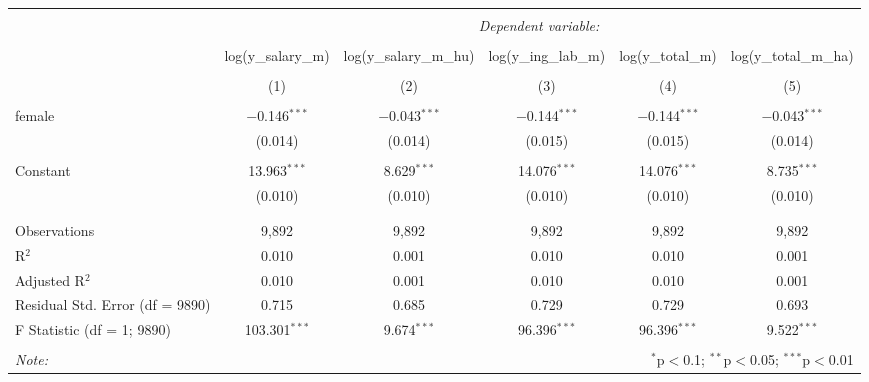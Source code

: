 
\begin{table}[!htbp] \centering 
  \caption{} 
  \label{} 
\begin{tabular}{@{\extracolsep{5pt}}lccccc} 
\\[-1.8ex]\hline 
\hline \\[-1.8ex] 
 & \multicolumn{5}{c}{\textit{Dependent variable:}} \\ 
\cline{2-6} 
\\[-1.8ex] & log(y\_salary\_m) & log(y\_salary\_m\_hu) & log(y\_ing\_lab\_m) & log(y\_total\_m) & log(y\_total\_m\_ha) \\ 
\\[-1.8ex] & (1) & (2) & (3) & (4) & (5)\\ 
\hline \\[-1.8ex] 
 female & $-$0.146$^{***}$ & $-$0.043$^{***}$ & $-$0.144$^{***}$ & $-$0.144$^{***}$ & $-$0.043$^{***}$ \\ 
  & (0.014) & (0.014) & (0.015) & (0.015) & (0.014) \\ 
  & & & & & \\ 
 Constant & 13.963$^{***}$ & 8.629$^{***}$ & 14.076$^{***}$ & 14.076$^{***}$ & 8.735$^{***}$ \\ 
  & (0.010) & (0.010) & (0.010) & (0.010) & (0.010) \\ 
  & & & & & \\ 
\hline \\[-1.8ex] 
Observations & 9,892 & 9,892 & 9,892 & 9,892 & 9,892 \\ 
R$^{2}$ & 0.010 & 0.001 & 0.010 & 0.010 & 0.001 \\ 
Adjusted R$^{2}$ & 0.010 & 0.001 & 0.010 & 0.010 & 0.001 \\ 
Residual Std. Error (df = 9890) & 0.715 & 0.685 & 0.729 & 0.729 & 0.693 \\ 
F Statistic (df = 1; 9890) & 103.301$^{***}$ & 9.674$^{***}$ & 96.396$^{***}$ & 96.396$^{***}$ & 9.522$^{***}$ \\ 
\hline 
\hline \\[-1.8ex] 
\textit{Note:}  & \multicolumn{5}{r}{$^{*}$p$<$0.1; $^{**}$p$<$0.05; $^{***}$p$<$0.01} \\ 
\end{tabular} 
\end{table} 
